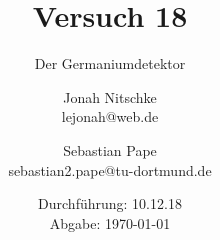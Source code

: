 

\title{Versuch 18}
\subtitle{Der Germaniumdetektor}
\author{Jonah Nitschke\\
        lejonah@web.de \and
        Sebastian Pape\\
        sebastian2.pape@tu-dortmund.de}
\date{Durchführung: 10.12.18\\
      Abgabe: \today}



\maketitle
\newpage
\setcounter{page}{1}


\newpage


\printbibliography


